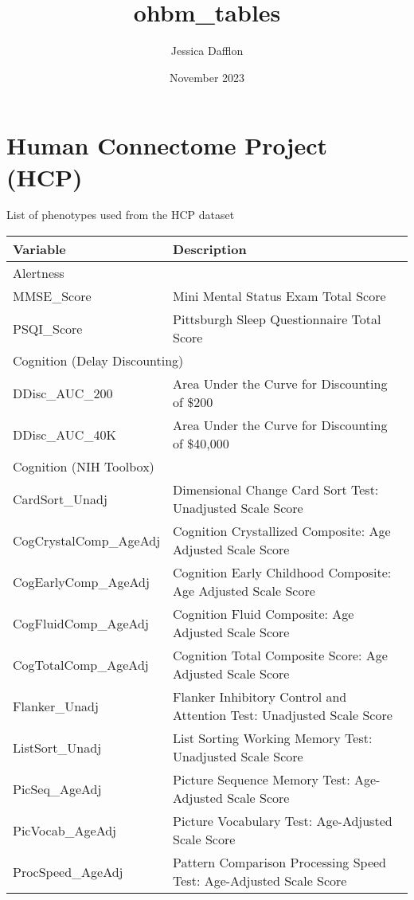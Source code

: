 \documentclass{article}
\title{ohbm_tables}
\author{Jessica Dafflon}
\date{November 2023}
\begin{document}

\section{Human Connectome Project (HCP)}
List of phenotypes used from the HCP dataset
\begin{longtable}{ll}
\toprule
\textbf{Variable} & \textbf{Description}\\
\midrule
\multicolumn{2}{l}{Alertness}\\
\midrule
MMSE\_Score & Mini Mental Status Exam Total Score\\
PSQI\_Score & Pittsburgh Sleep Questionnaire Total Score\\
\midrule
\multicolumn{2}{l}{Cognition (Delay Discounting)}\\
\midrule
DDisc\_AUC\_200 & Area Under the Curve for Discounting of \$200\\
DDisc\_AUC\_40K & Area Under the Curve for Discounting of \$40,000 \\
\midrule
\multicolumn{2}{l}{Cognition (NIH Toolbox)}\\
\midrule
CardSort\_Unadj & Dimensional Change Card Sort Test: Unadjusted Scale Score\\
CogCrystalComp\_AgeAdj & Cognition Crystallized Composite: Age Adjusted Scale Score\\
CogEarlyComp\_AgeAdj & Cognition Early Childhood Composite: Age Adjusted Scale Score\\
CogFluidComp\_AgeAdj & Cognition Fluid Composite: Age Adjusted Scale Score\\
CogTotalComp\_AgeAdj & Cognition Total Composite Score: Age Adjusted Scale Score\\
Flanker\_Unadj & Flanker Inhibitory Control and Attention Test: Unadjusted Scale Score\\
ListSort\_Unadj & List Sorting Working Memory Test: Unadjusted Scale Score\\
PicSeq\_AgeAdj & Picture Sequence Memory Test: Age-Adjusted Scale Score\\
PicVocab\_AgeAdj & Picture Vocabulary Test: Age-Adjusted Scale Score\\
ProcSpeed\_AgeAdj & Pattern Comparison Processing Speed Test: Age-Adjusted Scale Score\\

\end{longtable}
\end{document}
